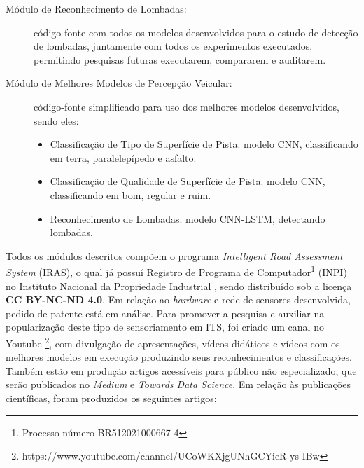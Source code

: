 \begin{small}
\begin{description}
    \item[Módulo de Reconhecimento de Lombadas:] código-fonte com todos os modelos desenvolvidos para o estudo de detecção de lombadas, juntamente com todos os experimentos executados, permitindo pesquisas futuras executarem, compararem e auditarem.
    
    \item[Módulo de Melhores Modelos de Percepção Veicular:] código-fonte simplificado para uso dos melhores modelos desenvolvidos, sendo eles:
    \begin{itemize}
        \item Classificação de Tipo de Superfície de Pista: modelo CNN, classificando em terra, paralelepípedo e asfalto.
        \item Classificação de Qualidade de Superfície de Pista: modelo CNN, classificando em bom, regular e ruim.
        \item Reconhecimento de Lombadas: modelo CNN-LSTM, detectando lombadas.
    \end{itemize}

\end{description}
\end{small}

Todos os módulos descritos compõem o programa \textit{Intelligent Road Assessment System} (IRAS), o qual já possuí Registro de Programa de Computador\footnote{Processo número BR512021000667-4} (INPI) no Instituto Nacional da Propriedade Industrial , sendo distribuído sob a licença \textbf{CC BY-NC-ND 4.0}. Em relação ao \textit{hardware} e rede de sensores desenvolvida, pedido de patente está em análise. Para promover a pesquisa e auxiliar na popularização deste tipo de sensoriamento em ITS, foi criado um canal no Youtube \footnote{https://www.youtube.com/channel/UCoWKXjgUNhGCYieR-ys-IBw}, com divulgação de apresentações, vídeos didáticos e vídeos com os melhores modelos em execução produzindo seus reconhecimentos e classificações. Também estão em produção artigos acessíveis para público não especializado, que serão publicados no \textit{Medium} e \textit{Towards Data Science}. Em relação às publicações científicas, foram produzidos os seguintes artigos: 

